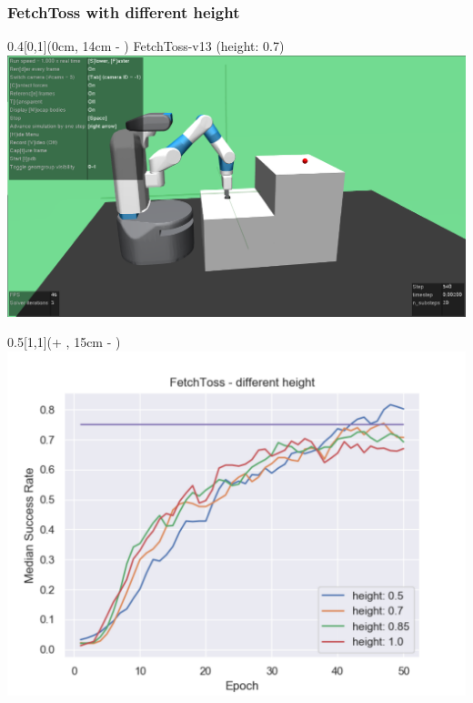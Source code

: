 \begin{frame}
	\frametitle{FetchToss with different height}	
	\vspace{1cm}
		
		
	\begin{textblock*}{0.4\paperwidth}[0,1](0cm, 14cm - \PraesentationSeitenrand)%
		FetchToss-v13 (height: 0.7)
		\includegraphics[width=0.4\paperwidth]{./Ressourcen/Figures/FetchToss-v13.pdf}
		
	\end{textblock*}
	
	\begin{textblock*}{0.5\paperwidth}[1,1](\textwidth + \PraesentationSeitenrand, 15cm - \PraesentationSeitenrand)%
		\includegraphics[width=0.5\paperwidth]{./Ressourcen/Figures/fig_FetchToss_height.pdf}
		
		
	\end{textblock*}
		
	
\end{frame}
\clearpage

